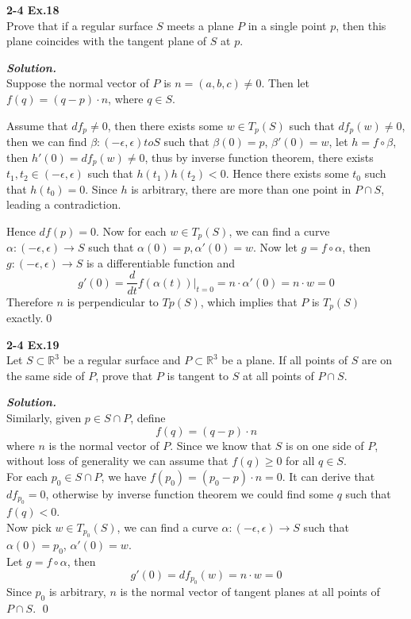 \documentclass{article}
\begin{document}
\par
\textbf{2-4 Ex.18}\\
Prove that if a regular surface $S$ meets a plane $P$ in a
single point $p$, then this plane coincides with the tangent
plane of $S$ at $p$.

\par
\textbf{\textit{Solution.}}\\
Suppose the normal vector of $P$ is $n=(a,b,c)\neq 0$.
Then let $f(q)=(q-p)\cdot n$, where $q \in S$.

Assume that $df_p \neq 0$, then there exists some $w \in T_p(S)$
such that $df_p(w) \neq 0$, then we can find $\beta: (-\epsilon, \epsilon) to S$
such that $\beta(0)=p$, $\beta'(0)=w$, let $h = f \circ \beta$,
then $h'(0) = df_p(w) \neq 0$, thus by inverse function theorem,
there exists $t_1, t_2 \in (-\epsilon, \epsilon)$ such that
$h(t_1)h(t_2)<0$. Hence there exists some $t_0$ such that
$h(t_0)=0$. Since $h$ is arbitrary, there are more than one
point in $P \cap S$, leading a contradiction.

Hence $df(p)=0$.
Now for each $w \in T_p(S)$, we can find a curve
$\alpha: (-\epsilon, \epsilon) \to S$ such that 
$\alpha(0)=p, \alpha'(0)=w$.
Now let $g = f \circ \alpha$, then 
$g: (-\epsilon, \epsilon) \to S$ is a differentiable
function and
$$
    g'(0) = \frac{d}{dt}f(\alpha(t))|_{t=0}
    = n \cdot \alpha'(0) = n \cdot w = 0
$$
Therefore $n$ is perpendicular to $Tp(S)$, which implies
that $P$ is $T_p(S)$ exactly.\qed

\par
\textbf{2-4 Ex.19}\\
Let $S \subset \mathbb{R}^3$ be a regular surface and
$P \subset \mathbb{R}^3$ be a plane. If all points of $S$
are on the same side of $P$, prove that $P$ is tangent to 
$S$ at all points of $P \cap S$.

\par
\textbf{\textit{Solution.}}\\
Similarly, given $p \in S \cap P$, define
$$
    f(q) = (q-p) \cdot n
$$
where $n$ is the normal vector of $P$.
Since we know that $S$ is on one side of $P$, without loss
of generality we can assume that $f(q) \geq 0$ for all $q \in S$.\\
For each $p_0 \in S \cap P$, we have 
$f(p_0)=(p_0-p) \cdot n = 0$. It can derive that
$df_{p_0}=0$, otherwise
by inverse function theorem we could find some $q$ such that
$f(q) < 0$.\\
Now pick $w \in T_{p_0}(S)$, we can find a curve $\alpha: (-\epsilon, \epsilon) \to S$
such that $\alpha(0) = p_0$, $\alpha'(0) = w$.\\
Let $g = f \circ \alpha$, then 
$$
g'(0) = df_{p_0}(w) = n \cdot w = 0
$$
Since $p_0$ is arbitrary, $n$ is the normal vector of tangent planes at all
points of $P \cap S$. \qed
\end{document}
